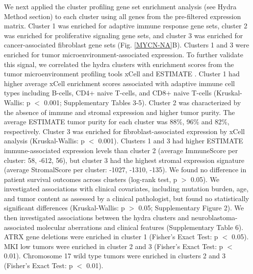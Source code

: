 \documentclass[10pt,letterpaper]{article}
\begin{document}
We next applied the cluster profiling gene set enrichment analysis (see Hydra Method section) to each cluster using all genes from the pre-filtered expression matrix. Cluster 1 was enriched for adaptive immune response gene sets, cluster 2 was enriched for proliferative signaling gene sets, and cluster 3 was enriched for cancer-associated fibroblast gene sets (Fig. \ref{MYCN-NA}B). Clusters 1 and 3 were enriched for tumor microenvironment-associated expression. To further validate this signal, we correlated the hydra clusters with enrichment scores from the tumor microenvironment profiling tools xCell \cite{aranXCellDigitallyPortraying2017} and ESTIMATE \cite{yoshiharaInferringTumourPurity2013a}. Cluster 1 had higher average xCell enrichment scores associated with adaptive immune cell types including B-cells, CD4+ naive T-cells, and CD8+ naive T-cells (Kruskal-Wallis: p $<$ 0.001; Supplementary Tables 3-5). Cluster 2 was characterized by the absence of immune and stromal expression and higher tumor purity. The average ESTIMATE tumor purity for each cluster was 88\%, 96\% and 82\%, respectively. Cluster 3 was enriched for fibroblast-associated expression by xCell analysis (Kruskal-Wallis: p $<$ 0.001). Clusters 1 and 3 had higher ESTIMATE immune-associated expression levels than cluster 2 (average ImmuneScore per cluster: 58, -612, 56), but cluster 3 had the highest stromal expression signature (average StromalScore per cluster: -1027, -1310, -135). We found no difference in patient survival outcomes across clusters (log-rank test, p $>$ 0.05). We investigated associations with clinical covariates, including mutation burden, age, and tumor content as assessed by a clinical pathologist, but found no statistically significant differences (Kruskal-Wallis: p $>$ 0.05; Supplementary Figure 2). We then investigated associations between the hydra clusters and neuroblastoma-associated molecular aberrations and clinical features (Supplementary Table 6). ATRX gene deletions were enriched in cluster 1 (Fisher’s Exact Test: p $<$ 0.05). MKI low tumors were enriched in cluster 2 and 3 (Fisher’s Exact Test: p $<$ 0.01). Chromosome 17 wild type tumors were enriched in clusters 2 and 3 (Fisher’s Exact Test: p $<$ 0.01).
\end{document}
